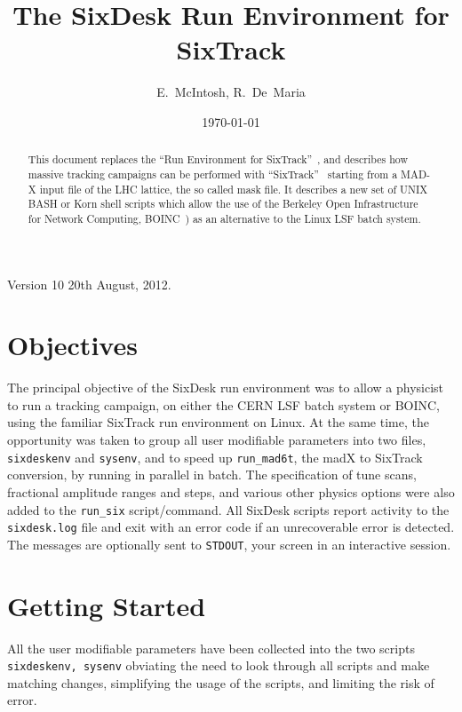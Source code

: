 \documentclass{cernatsnote}    %
\begin{document}
\begin{titlepage}
\date{\today}
\title{The SixDesk Run Environment for SixTrack} 
\author{E.~McIntosh, R.~De~Maria}

\maketitle
 
\begin{abstract}
  This document replaces the ``Run Environment for 
  SixTrack''~\cite{Runsix},
  and describes how massive tracking campaigns can be
  performed with ``SixTrack''~\cite{SixTrack} starting from a MAD-X input
  file of the LHC lattice, the so called mask file. It describes a new set 
  of UNIX BASH or Korn shell scripts which allow the use of 
  the Berkeley Open Infrastructure for
 Network Computing, BOINC~\cite{Boinc}) as an alternative to the Linux LSF batch system.
\end{abstract}

\end{titlepage}
%
Version 10 20th August, 2012.

\section{Objectives}
%
The principal objective of the SixDesk run environment was to allow a physicist to
run a tracking campaign, on either the CERN LSF batch system or BOINC,
using the familiar SixTrack run environment on Linux. 
At the same time, the opportunity was taken to group all
user modifiable parameters into two files, {\tt sixdeskenv} and {\tt sysenv}, 
and to speed up
{\tt run\_mad6t}, the madX to SixTrack conversion, by running in parallel in batch. 
The specification of tune scans, fractional amplitude ranges and steps, and various
other physics options were also added to the {\tt run\_six} script/command.
All SixDesk scripts report activity to the {\tt sixdesk.log} file
and exit with an error code if an unrecoverable error is detected.
The messages are optionally sent to {\tt STDOUT}, your screen in an interactive
session.
%
\section{Getting Started}
All the user modifiable parameters have been collected 
into the two scripts {\tt sixdeskenv, sysenv} obviating the need to look through all
scripts and make matching changes, simplifying the usage of the scripts,
and limiting the risk of error.
\end{document}
